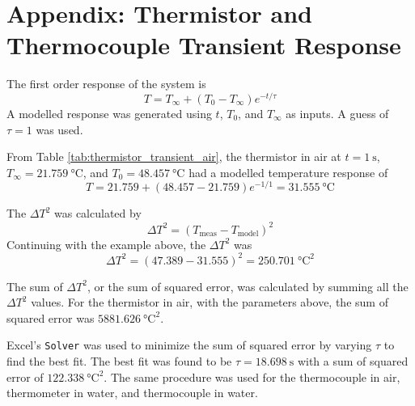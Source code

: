 \section{Appendix: Thermistor and Thermocouple Transient Response}
\noindent The first order response of the system is 
\begin{equation*}
    T = T_{\infty} + (T_0 - T_{\infty})e^{-t/\tau}
\end{equation*}
A modelled response was generated using $t$, $T_0$, and $T_{\infty}$ as inputs. A guess of $\tau = 1$ was used.

From Table \ref{tab:thermistor_transient_air}, the thermistor in air at $t = \qty{1}{\second}$, $T_{\infty} = \qty{21.759}{\celsius}$, 
and $T_0 = \qty{48.457}{\celsius}$ had a modelled temperature response of
\begin{equation*}
    T = 21.759 + (48.457 - 21.759)e^{-1/1} = \qty{31.555}{\celsius}
\end{equation*}

The $\Delta T^2$ was calculated by
\begin{equation*}
    \Delta T^2 = (T_{\text{meas}} - T_{\text{model}})^2 
\end{equation*}
Continuing with the example above, the $\Delta T^2$ was
\begin{equation*}
    \Delta T^2 = (47.389 - 31.555)^2 = \qty{250.701}{\celsius\squared}
\end{equation*}

The sum of $\Delta T^2$, or the sum of squared error, was calculated by summing all the $\Delta T^2$ values. For the thermistor in air, with 
the parameters above, the sum of squared error was $\qty{5881.626}{\celsius\squared}$.

Excel's \texttt{Solver} was used to minimize the sum of squared error by varying $\tau$ to find the best fit. The best fit was found to be
$\tau = \qty{18.698}{\second}$ with a sum of squared error of $\qty{122.338}{\celsius\squared}$. The same procedure was used for the thermocouple in air, 
thermometer in water, and thermocouple in water. 